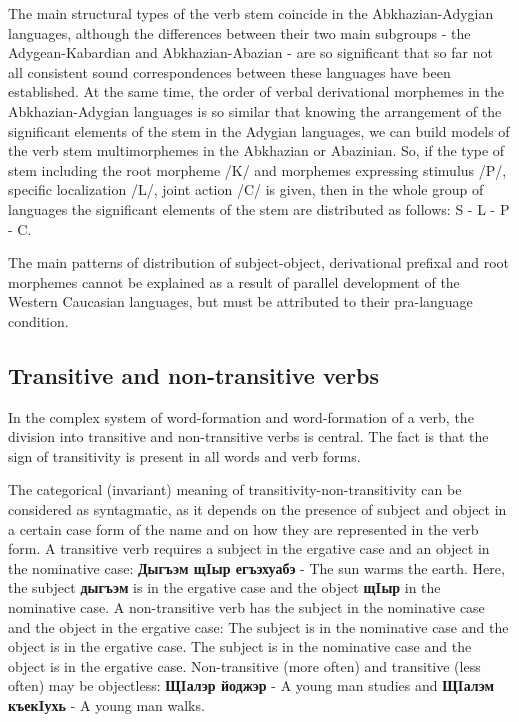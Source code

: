 \documentclass[a4paper,12pt]{book}
\newcommand{\1}[1]{\textbf{\emph{#1}}} %
\newcommand{\2}[1]{\textbf{[#1]}} %
\newcommand{\3}[1]{\fontsize{11pt}{0cm}\textbf{\emph{#1}}} %
\newcommand{\4}[1]{\fontsize{10pt}{0cm}\emph{#1}}	%
\newcommand{\5}[1]{\textbf{/#1/}} %
\newcommand{\6}[1]{\textbf{[#1]}} %
\newcommand{\7}[1]{\fontsize{12pt}{0cm}\emph{#1}} %
\newcommand{\8}[1]{\fontsize{12pt}{0cm}`#1'} %
\newcommand{\9}[1]{\fontsize{12pt}{0cm}(lit. `#1')} %
\begin{document}
The main structural types of the verb stem coincide in the Abkhazian-Adygian languages, although the differences between their two main subgroups - the Adygean-Kabardian and Abkhazian-Abazian - are so significant that so far not all consistent sound correspondences between these languages have been established. At the same time, the order of verbal derivational morphemes in the Abkhazian-Adygian languages is so similar that knowing the arrangement of the significant elements of the stem in the Adygian languages, we can build models of the verb stem multimorphemes in the Abkhazian or Abazinian. So, if the type of stem including the root morpheme /K/ and morphemes expressing stimulus /P/, specific localization /L/, joint action /C/ is given, then in the whole group of languages the significant elements of the stem are distributed as follows: S - L - P - C.

The main patterns of distribution of subject-object, derivational prefixal and root morphemes cannot be explained as a result of parallel development of the Western Caucasian languages, but must be attributed to their pra-language condition.\\
\subsection{Transitive and non-transitive verbs}
In the complex system of word-formation and word-formation of a verb, the division into transitive and non-transitive verbs is central. The fact is that the sign of transitivity is present in all words and verb forms.

The categorical (invariant) meaning of transitivity-non-transitivity can be considered as syntagmatic, as it depends on the presence of subject and object in a certain case form of the name and on how they are represented in the verb form. A transitive verb requires a subject in the ergative case and an object in the nominative case: \textbf{Дыгъэм щIыр егъэхуабэ} - The sun warms the earth. Here, the subject \textbf{дыгъэм} is in the ergative case and the object \textbf{щIыр} in the nominative case. A non-transitive verb has the subject in the nominative case and the object in the ergative case: The subject is in the nominative case and the object is in the ergative case. The subject is in the nominative case and the object is in the ergative case. Non-transitive (more often) and transitive (less often) may be objectless: \textbf{ЩIалэр йоджэр} - A young man studies and \textbf{ЩIалэм къекIухь} - A young man walks.
\end{document}
